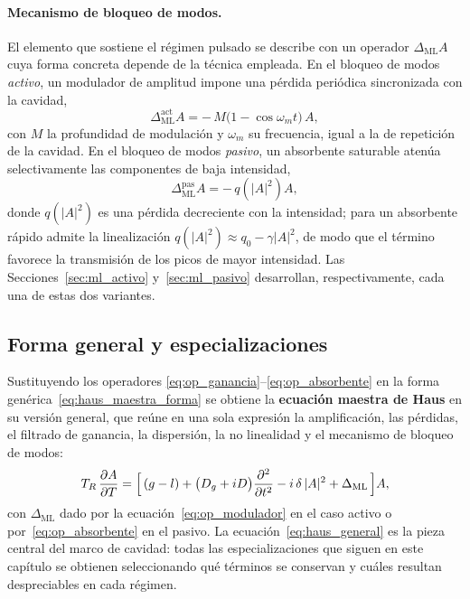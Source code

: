 \paragraph{Mecanismo de bloqueo de modos.}
El elemento que sostiene el régimen pulsado se describe con un operador
$\Delta_{\mathrm{ML}}A$ cuya forma concreta depende de la técnica empleada. En el
bloqueo de modos \emph{activo}, un modulador de amplitud impone una pérdida
periódica sincronizada con la cavidad,
%
\begin{equation}
    \Delta_{\mathrm{ML}}^{\text{act}} A = -\,M\bigl(1-\cos\omega_m t\bigr)\,A ,
    \label{eq:op_modulador}
\end{equation}
%
con $M$ la profundidad de modulación y $\omega_m$ su frecuencia, igual a la de
repetición de la cavidad. En el bloqueo de modos \emph{pasivo}, un absorbente
saturable atenúa selectivamente las componentes de baja intensidad,
%
\begin{equation}
    \Delta_{\mathrm{ML}}^{\text{pas}} A = -\,q\!\left(|A|^2\right) A ,
    \label{eq:op_absorbente}
\end{equation}
%
donde $q(|A|^2)$ es una pérdida decreciente con la intensidad; para un absorbente
rápido admite la linealización $q(|A|^2)\approx q_0-\gamma|A|^2$, de modo que el
término favorece la transmisión de los picos de mayor intensidad. Las
Secciones~\ref{sec:ml_activo} y~\ref{sec:ml_pasivo} desarrollan, respectivamente,
cada una de estas dos variantes.
 
\subsection{Forma general y especializaciones}
 
Sustituyendo los operadores
\eqref{eq:op_ganancia}--\eqref{eq:op_absorbente} en la
forma genérica~\eqref{eq:haus_maestra_forma} se obtiene la \textbf{ecuación
maestra de Haus} en su versión general, que reúne en una sola expresión la
amplificación, las pérdidas, el filtrado de ganancia, la dispersión, la no
linealidad y el mecanismo de bloqueo de modos:
%
\begin{equation}
    T_R\,\frac{\partial A}{\partial T}
    = \Bigl[\,(g-l)
      + \bigl(D_g + iD\bigr)\frac{\partial^2}{\partial t^2}
      - i\,\delta\,|A|^2
      + \Delta_{\mathrm{ML}} \,\Bigr] A ,
    \label{eq:haus_general}
\end{equation}
%
con $\Delta_{\mathrm{ML}}$ dado por la
ecuación~\eqref{eq:op_modulador} en el caso activo o
por~\eqref{eq:op_absorbente} en el pasivo. La
ecuación~\eqref{eq:haus_general} es la pieza central del marco de cavidad: todas
las especializaciones que siguen en este capítulo se obtienen seleccionando qué
términos se conservan y cuáles resultan despreciables en cada régimen.
 
